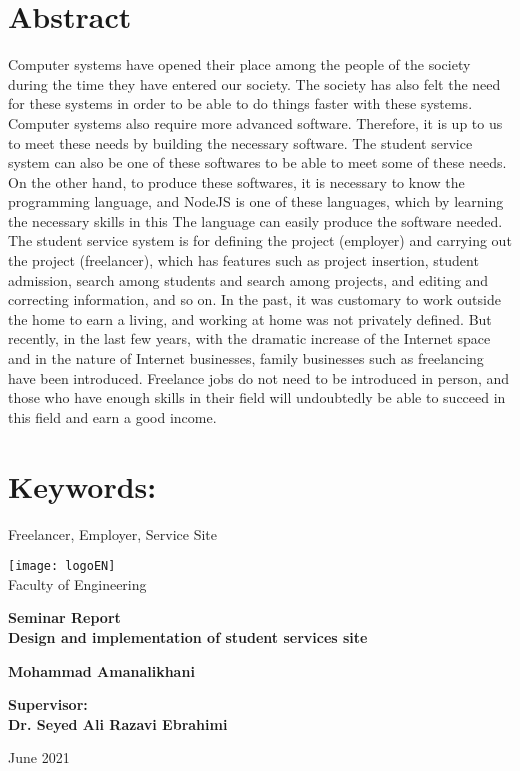 
\thispagestyle{empty}

\begin{LTR}
\begin{flushleft}

\section*{Abstract}
Computer systems have opened their place among the people of the society during the time they have entered our society.
The society has also felt the need for these systems in order to be able to do things faster with these systems.
Computer systems also require more advanced software.
Therefore, it is up to us to meet these needs by building the necessary software.
The student service system can also be one of these softwares to be able to meet some of these needs.
On the other hand, to produce these softwares, it is necessary to know the programming language, and NodeJS is one of these languages, which by learning the necessary skills in this The language can easily produce the software needed.
The student service system is for defining the project (employer) and carrying out the project (freelancer), which has features such as project insertion, student admission, search among students and search among projects, and editing and correcting information, and so on.
In the past, it was customary to work outside the home to earn a living, and working at home was not privately defined.
But recently, in the last few years, with the dramatic increase of the Internet space and in the nature of Internet businesses, family businesses such as freelancing have been introduced.
Freelance jobs do not need to be introduced in person, and those who have enough skills in their field will undoubtedly be able to succeed in this field and earn a good income.
\section*{Keywords:}
Freelancer, Employer, Service Site

\clearpage

\begin{titlepage}

	\centering
	\texttt{[image: logoEN]}
	\\[10pt]
	{\Large
		Faculty of Engineering
	‬‫‬‬}

	\vfill
	{\Large \bfseries
		Seminar Report
	} \\[10pt]
	{\huge	\bfseries
		Design and implementation of student services site
	}

	\vfill
	{\large \bfseries
	Mohammad Amanalikhani
	}

	\vfill
	{\large \bfseries
		Supervisor:
		\\[10pt]
		Dr. Seyed Ali Razavi Ebrahimi
	}

	\vfill
	{\large
		June 2021
	}


\end{titlepage}

\end{flushleft}
\end{LTR}
\clearpage








